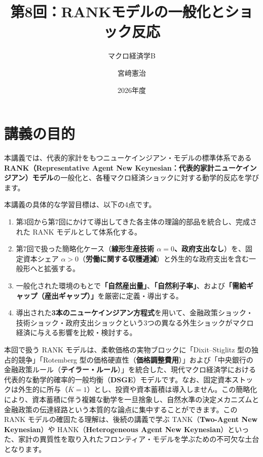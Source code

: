 \documentclass[
  japanese,
  lualatex,
  ja=standard,
  12pt,
  a4paper]{ltjsarticle}
\title{第8回：RANKモデルの一般化とショック反応}
\subtitle{マクロ経済学B}
\author{宮﨑憲治}
\date{2026年度}
\providecommand{\tightlist}{%
  \setlength{\itemsep}{0pt}\setlength{\parskip}{0pt}}
\renewcommand*\contentsname{目次}
\newcommand\contentsname{目次}
\begin{document}
\maketitle

\renewcommand*\contentsname{目次}
{
\setcounter{tocdepth}{1}
\tableofcontents
}

\section{講義の目的}\label{ux8b1bux7fa9ux306eux76eeux7684}

本講義では、代表的家計をもつニューケインジアン・モデルの標準体系である\textbf{RANK（Representative
Agent New
Keynesian：代表的家計ニューケインジアン）モデル}の一般化と、各種マクロ経済ショックに対する動学的反応を学びます。

本講義の具体的な学習目標は、以下の4点です。

\begin{enumerate}
\def\labelenumi{\arabic{enumi}.}
\tightlist
\item
  第3回から第7回にかけて導出してきた各主体の理論的部品を統合し、完成された
  RANK モデルとして体系化する。
\item
  第7回で扱った簡略化ケース（\textbf{線形生産技術
  \(\alpha=0\)、政府支出なし}）を、固定資本シェア
  \(\alpha>0\)（\textbf{労働に関する収穫逓減}）と外生的な政府支出を含む一般形へと拡張する。
\item
  一般化された環境のもとで\textbf{「自然産出量」}、\textbf{「自然利子率」}、および\textbf{「需給ギャップ（産出ギャップ）」}を厳密に定義・導出する。
\item
  導出された\textbf{3本のニューケインジアン方程式}を用いて、金融政策ショック・技術ショック・政府支出ショックという3つの異なる外生ショックがマクロ経済に与える影響を比較・検討する。
\end{enumerate}

本回で扱う RANK モデルは、柔軟価格の実物ブロックに「Dixit--Stiglitz
型の独占的競争」「Rotemberg
型の価格硬直性（\textbf{価格調整費用}）」および「中央銀行の金融政策ルール（\textbf{テイラー・ルール}）」を統合した、現代マクロ経済学における代表的な動学的確率的一般均衡（\textbf{DSGE}）モデルです。なお、固定資本ストックは外生的に所与（\textbf{\(\bar{K}=1\)}）とし、投資や資本蓄積は導入しません。この簡略化により、資本蓄積に伴う複雑な動学を一旦捨象し、自然水準の決定メカニズムと金融政策の伝達経路という本質的な論点に集中することができます。この
RANK モデルの確固たる理解は、後続の講義で学ぶ TANK（\textbf{Two-Agent
New Keynesian}）や HANK（\textbf{Heterogeneous Agent New
Keynesian}）といった、家計の異質性を取り入れたフロンティア・モデルを学ぶための不可欠な土台となります。
\end{document}
